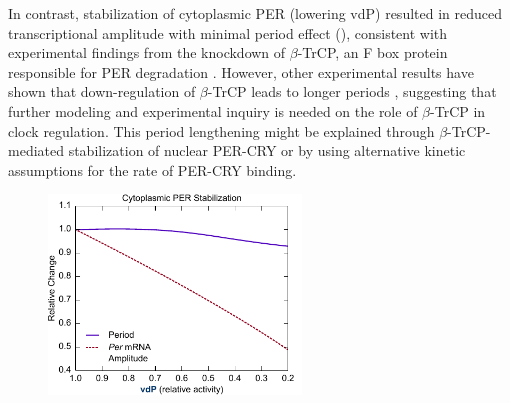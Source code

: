 In contrast, stabilization of cytoplasmic PER (lowering vdP) resulted in reduced transcriptional amplitude with minimal period effect (), consistent with experimental findings from the knockdown of $\beta$-TrCP, an F box protein responsible for PER degradation \cite{Ohsaki2008}. 
However, other experimental results have shown that down-regulation of $\beta$-TrCP leads to longer periods \cite{Reischl2007}, suggesting that further modeling and experimental inquiry is needed on the role of $\beta$-TrCP in clock regulation. 
This period lengthening might be explained through $\beta$-TrCP-mediated stabilization of nuclear PER-CRY or by using alternative kinetic assumptions for the rate of PER-CRY binding. 

\begin{figure}[h]
  \centering
  \includegraphics[width=0.6\textwidth]{chap4/figures/figS3.pdf}
  \label{fig:4S3}
\end{figure}


